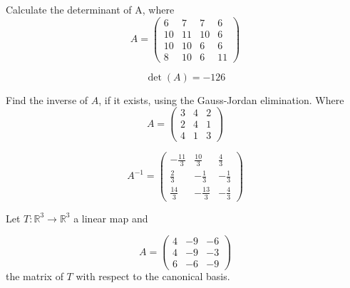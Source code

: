 \begin{questions}

\question Calculate the determinant of A, where
$$
A=\left(\begin{array}{rrrr}
6 & 7 & 7 & 6 \\
10 & 11 & 10 & 6 \\
10 & 10 & 6 & 6 \\
8 & 10 & 6 & 11
\end{array}\right)
$$

\begin{solution}
$$\det(A)=-126$$
\end{solution}

\question Find the inverse of $A$, if it exists, using the Gauss-Jordan elimination. Where
$$
A=\left(\begin{array}{rrr}
3 & 4 & 2 \\
2 & 4 & 1 \\
4 & 1 & 3
\end{array}\right)
$$

\begin{solution}
$$A^{-1}=\left(\begin{array}{rrr}
-\frac{11}{3} & \frac{10}{3} & \frac{4}{3} \\
\frac{2}{3} & -\frac{1}{3} & -\frac{1}{3} \\
\frac{14}{3} & -\frac{13}{3} & -\frac{4}{3}
\end{array}\right)$$
\end{solution}

\question Let $T:\mathbb{R}^3\rightarrow\mathbb{R}^3$  a linear map and
 
$$
A=\left(\begin{array}{rrr}
4 & -9 & -6 \\
4 & -9 & -3 \\
6 & -6 & -9
\end{array}\right)
$$
the matrix of $T$ with respect to the canonical basis.
\end{questions}
